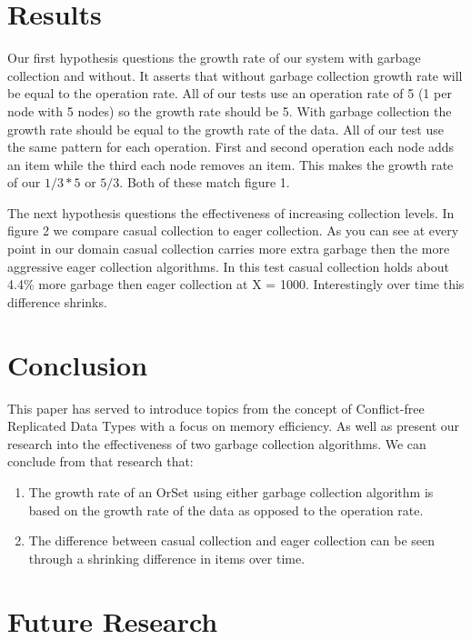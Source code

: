 \documentclass{article}
\begin{document}
\begin{multicols}{2}
\begin{refsection}
\section*{Results}

Our first hypothesis questions the growth rate of our system with garbage
collection and without. It asserts that without garbage collection
growth rate will be equal to the operation rate. All of our tests use
an operation rate of 5 (1 per node with 5 nodes) so the growth rate
should be 5. With garbage collection the growth rate should be equal to
the growth rate of the data. All of our test use the same pattern for
each operation. First and second operation each node adds an item while
the third each node removes an item. This makes the growth rate of our
$1/3 * 5$ or $5/3$. Both of these match figure 1.


The next hypothesis questions the effectiveness of increasing collection
levels. In figure 2 we compare casual collection to eager collection. As
you can see at every point in our domain casual collection carries more
extra garbage then the more aggressive eager collection algorithms.
In this test casual collection holds about 4.4\% more garbage then eager
collection at X = 1000. Interestingly over time this difference shrinks.

\section*{Conclusion}

This paper has served to introduce topics from the concept of
Conflict-free Replicated Data Types with a focus on memory efficiency.
As well as present our research into the effectiveness of two garbage
collection algorithms. We can conclude from that research that:

\begin{enumerate}
    \item The growth rate of an OrSet using either garbage
        collection algorithm is based on the growth rate of
        the data as opposed to the operation rate.
    \bigskip
    \item The difference between casual collection and eager
        collection can be seen through a shrinking difference in
        items over time.
\end{enumerate}

\section*{Future Research}


\end{refsection}
\end{multicols}
\end{document}
